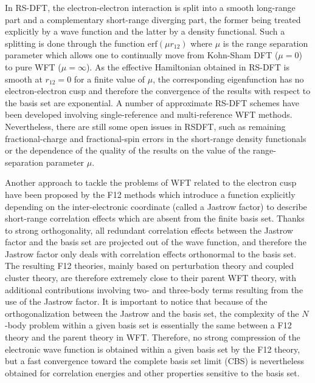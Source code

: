 \documentclass[aip,jcp,reprint,noshowkeys,superscriptaddress,twocolumn]{revtex4-1}
\begin{document}
In RS-DFT\cite{Sav-INC-96a,TouColSav-PRA-04}, the electron-electron interaction is split into a smooth long-range part and a complementary short-range diverging part, the former being treated explicitly by a wave function and the latter by a density functional. 
Such a splitting is done through the function $\text{erf}(\mu r_{12})$ where $\mu$ is the range separation parameter which allows one to continually move from Kohn-Sham DFT ($\mu=0$) to pure WFT ($\mu=\infty$). 
As the effective Hamiltonian obtained in RS-DFT is smooth at $r_{12}=0$ for a finite value of $\mu$, the corresponding eigenfunction has no electron-electron cusp\cite{GorSav-PRA-06} and therefore the convergence of the results with respect to the basis set are exponential\cite{FraMusLupTou-JCP-15}. 
A number of approximate RS-DFT schemes have been developed involving single-reference\cite{AngGerSavTou-PRA-05, GolWerSto-PCCP-05, TouGerJanSavAng-PRL-09,JanHenScu-JCP-09,TouZhuSavJanAng-JCP-11, MusReiAngTou-JCP-15,KalTou-JCP-18,KalMusTou-JCP-19} and multi-reference\cite{LeiStoWerSav-CPL-97, FroTouJen-JCP-07, FroCimJen-PRA-10, HedKneKieJenRei-JCP-15, HedTouJen-JCP-18, FerGinTou-JCP-18} WFT methods. 
Nevertheless, there are still some open issues in RSDFT, such as remaining fractional-charge and fractional-spin errors in the short-range density functionals \cite{MusTou-MP-17} or the dependence of the quality of the results on the value of the range-separation parameter $\mu$. 

Another approach to tackle the problems of WFT related to the electron cusp have been proposed by the F12 methods which introduce a function explicitly depending on the inter-electronic coordinate\cite{Ten-TCA-12,TenNog-WIREs-12,HatKloKohTew-CR-12, KonBisVal-CR-12, GruHirOhnTen-JCP-17, MaWer-WIREs-18} (called a Jastrow factor) to describe short-range correlation effects which are absent from the finite basis set. Thanks to strong orthogonality, 
all redundant correlation effects between the Jastrow factor and the basis set are projected out of the wave function, 
and therefore the Jastrow factor only deals with correlation effects orthonormal to the basis set. 
The resulting F12 theories, mainly based on perturbation theory and coupled cluster theory, are therefore 
extremely close to their parent WFT theory, with additional contributions involving two- and three-body terms resulting from the use of the Jastrow factor. 
It is important to notice that because of the orthogonalization between the Jastrow and the basis set, 
the complexity of the $N$-body problem within a given basis set is essentially the same between a F12 theory and the parent theory in WFT. Therefore, no strong compression of the electronic wave function is obtained within a given basis set by the F12 theory, 
but a fast convergence toward the complete basis set limit (CBS) is nevertheless obtained for correlation energies and other properties sensitive to the basis set.  
\end{document}
